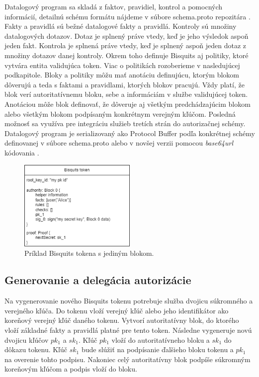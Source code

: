 Datalogový program sa skladá z faktov, pravidiel, kontrol a pomocných informácií, detailnú schému formátu nájdeme v súbore schema.proto repozitára \cite{biscuits_git}. Fakty a pravidlá sú bežné datalogové fakty a pravidlá. Kontroly sú množiny datalogových dotazov. Dotaz je splnený práve vtedy, keď je jeho výsledok aspoň jeden fakt. Kontrola je splnená práve vtedy, keď je splnený aspoň jeden dotaz z množiny dotazov danej kontroly. Okrem toho definuje Bisquits aj politiky, ktoré vytvára entita validujúca token. Viac o politikách rozoberieme v nasledujúcej podkapitole. Bloky a politiky môžu mať anotáciu definujúcu, ktorým blokom dôverujú a teda s faktami a pravidlami, ktorých blokov pracujú. Vždy platí, že blok verí autoritatívnemu bloku, sebe a informáciám v službe validujúcej token. Anotáciou môže blok definovať, že dôveruje aj všetkým predchádzajúcim blokom alebo všetkým blokom podpísaným konkrétnym verejným kľúčom. Posledná možnosť sa využíva pre integráciu služieb tretích strán do autorizačnej schémy.
Datalogový program je serializovaný ako Protocol Buffer \cite{protobuf} podľa konkrétnej schémy definovanej v súbore schema.proto alebo v novšej verzii pomocou \textit{base64url} kódovania \cite{base64_rfc}.

\begin{figure}
    \centerline{\includegraphics[width=0.5\textwidth]{images/bisquits_token2}}
    \caption[Bisquits token]{Príklad Bisquits tokena s jediným blokom.}
    \label{fig:bisquits_token}
\end{figure}

\subsection{Generovanie a delegácia autorizácie}

Na vygenerovanie nového Bisquits tokenu potrebuje služba dvojicu súkromného a verejného kľúča. Do tokenu vloží verejný kľúč alebo jeho identifikátor ako koreňový verejný kľúč daného tokenu. Vytvorí autoritatívny blok, do ktorého vloží základné fakty a pravidlá platné pre tento token. Následne vygeneruje novú dvojicu kľúčov $pk_1$ a $sk_1$. Kľúč $pk_1$ vloží do autoritatívneho bloku a $sk_1$ do dôkazu tokenu. Kľúč $sk_1$ bude slúžiť na podpísanie ďalšieho bloku tokenu a $pk_1$ na overenie tohto podpisu. Nakoniec celý autoritatívny blok podpíše súkromným koreňovým kľúčom a podpis vloží do bloku.

